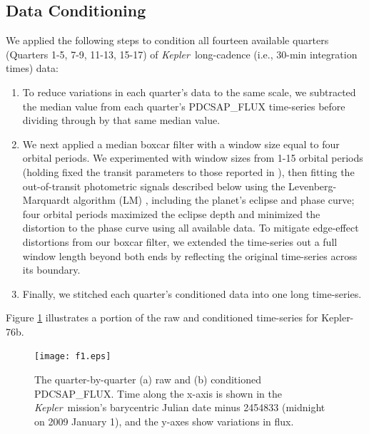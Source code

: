 \documentclass[manuscript]{aastex62}
\newcommand{\kepler}{{\it Kepler}}
\begin{document}
\subsection{Data Conditioning}
We applied the following steps to condition all fourteen available quarters (Quarters 1-5, 7-9, 11-13, 15-17) of \kepler\ long-cadence (i.e., 30-min integration times) data:
\begin{enumerate}
\item To reduce variations in each quarter's data to the same scale, we subtracted the median value from each quarter's PDCSAP\_FLUX time-series before dividing through by that same median value.
\item We next applied a median boxcar filter with a window size equal to four orbital periods. We experimented with window sizes from 1-15 orbital periods (holding fixed the transit parameters to those reported in \citealt{2013ApJ...771...26F}), then fitting the out-of-transit photometric signals described below using the Levenberg-Marquardt algorithm (LM) \citep{newville_2014_11813}, including the planet's eclipse and phase curve; four orbital periods maximized the eclipse depth and minimized the distortion to the phase curve using all available data. To mitigate edge-effect distortions from our boxcar filter, we extended the time-series out a full window length beyond both ends by reflecting the original time-series across its boundary.
\item Finally, we stitched each quarter's conditioned data into one long time-series.
\end{enumerate}
Figure \ref{fig:raw-conditioned-data_Analysis_of_Kepler76b} illustrates a portion of the raw and conditioned time-series for Kepler-76b. 

\begin{figure}
\texttt{[image: f1.eps]}
\caption{The quarter-by-quarter (a) raw and (b) conditioned PDCSAP\_FLUX. Time along the x-axis is shown in the \kepler\ mission's barycentric Julian date minus 2454833 (midnight on 2009 January 1), and the y-axes show variations in flux.\label{fig:raw-conditioned-data_Analysis_of_Kepler76b}}
\end{figure}
\end{document}
